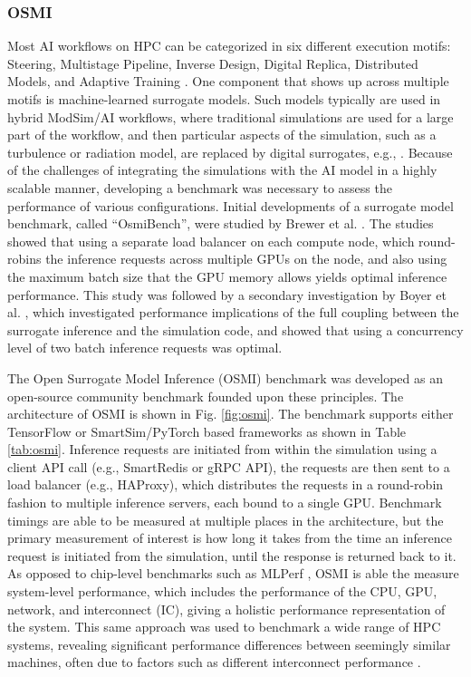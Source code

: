 \documentclass[utf8]{FrontiersinVancouver} %
\begin{document}
\subsubsection{OSMI}

Most AI workflows on HPC can be categorized in six different execution motifs: Steering, Multistage Pipeline, Inverse Design, Digital Replica, Distributed Models, and Adaptive Training \cite{brewer2024ai}. One component that shows up across multiple motifs is machine-learned surrogate models. Such models typically are used in hybrid ModSim/AI workflows, where traditional simulations are used for a large part of the workflow, and then particular aspects of the simulation, such as a turbulence or radiation model, are replaced by digital surrogates, e.g., \cite{partee2022using, martinez2022roam, bhushan2023assessment}. Because of the challenges of integrating the simulations with the AI model in a highly scalable manner, developing a benchmark was necessary to assess the performance of various configurations. Initial developments of a surrogate model benchmark, called ``OsmiBench'', were studied by Brewer et al. \cite{brewer2021production}. The studies showed that using a separate load balancer on each compute node, which round-robins the inference requests across multiple GPUs on the node, and also using the maximum batch size that the GPU memory allows yields optimal inference performance. This study was followed by a secondary investigation by Boyer et al. \cite{boyer2022scalable}, which investigated performance implications of the full coupling between the surrogate inference and the simulation code, and showed that using a concurrency level of two batch inference requests was optimal. 

The Open Surrogate Model Inference (OSMI) benchmark was developed as an open-source community benchmark founded upon these principles. The architecture of OSMI is shown in Fig. \ref{fig:osmi}. The benchmark supports either TensorFlow or SmartSim/PyTorch based frameworks as shown in Table \ref{tab:osmi}. Inference requests are initiated from within the simulation using a client API call (e.g., SmartRedis or gRPC API), the requests are then sent to a load balancer (e.g., HAProxy), which distributes the requests in a round-robin fashion to multiple inference servers, each bound to a single GPU. Benchmark timings are able to be measured at multiple places in the architecture, but the primary measurement of interest is how long it takes from the time an inference request is initiated from the simulation, until the response is returned back to it. As opposed to chip-level benchmarks such as MLPerf \cite{reddi2020mlperf}, OSMI is able the measure system-level performance, which includes the performance of the CPU, GPU, network, and interconnect (IC), giving a holistic performance representation of the system. This same approach was used to benchmark a wide range of HPC systems, revealing significant performance differences between seemingly similar machines, often due to factors such as different interconnect performance \cite{brewer2020inference}.
\end{document}
